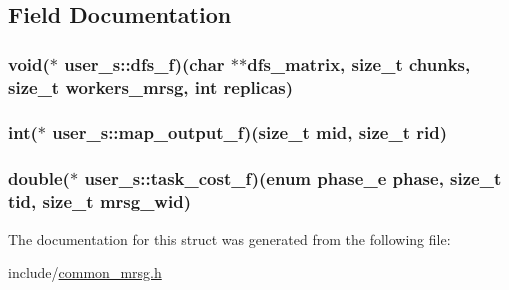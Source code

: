 \subsection{\-Field \-Documentation}
\hypertarget{structuser__s_ae49d248b815f38f868f152e6e277c597}{
\subsubsection[{dfs\-\_\-f}]{\setlength{\rightskip}{0pt plus 5cm}void($\ast$ {\bf user\-\_\-s\-::dfs\-\_\-f})(char $\ast$$\ast$dfs\-\_\-matrix, size\-\_\-t chunks, size\-\_\-t workers\-\_\-mrsg, int replicas)}}\label{structuser__s_ae49d248b815f38f868f152e6e277c597}
\hypertarget{structuser__s_ac4bd9204f029bd849edb08e1bdb76845}{
\subsubsection[{map\-\_\-output\-\_\-f}]{\setlength{\rightskip}{0pt plus 5cm}int($\ast$ {\bf user\-\_\-s\-::map\-\_\-output\-\_\-f})(size\-\_\-t mid, size\-\_\-t rid)}}\label{structuser__s_ac4bd9204f029bd849edb08e1bdb76845}
\hypertarget{structuser__s_a5e44111bc441ef543412b2507e37cd02}{
\subsubsection[{task\-\_\-cost\-\_\-f}]{\setlength{\rightskip}{0pt plus 5cm}double($\ast$ {\bf user\-\_\-s\-::task\-\_\-cost\-\_\-f})(enum {\bf phase\-\_\-e} phase, size\-\_\-t tid, size\-\_\-t mrsg\-\_\-wid)}}\label{structuser__s_a5e44111bc441ef543412b2507e37cd02}


\-The documentation for this struct was generated from the following file\-:\begin{DoxyCompactItemize}
\item 
include/\hyperlink{common__mrsg_8h}{common\-\_\-mrsg.\-h}\end{DoxyCompactItemize}
